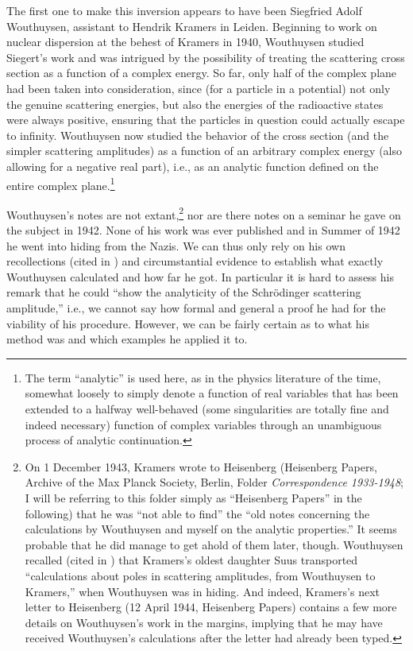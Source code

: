 \documentclass[12pt,a4paper]{article}
\begin{document}
The first one to make this inversion appears to have been Siegfried Adolf Wouthuysen, assistant to Hendrik Kramers in Leiden. Beginning to work on nuclear dispersion at the behest of Kramers in 1940, Wouthuysen studied Siegert's work and was intrigued by the possibility of treating the scattering cross section as a function of a complex energy. So far, only half of the complex plane had been taken into consideration, since (for a particle in a potential) not only the genuine scattering energies, but also the energies of the radioactive states were always positive, ensuring that the particles in question could actually escape to infinity. Wouthuysen now studied the behavior of the cross section (and the simpler scattering amplitudes) as a function of an arbitrary complex energy (also allowing for a negative real part), i.e., as an analytic function defined on the entire complex plane.\footnote{The term ``analytic'' is used here, as in the physics literature of the time, somewhat loosely to simply denote a function of real variables that has been extended to a halfway well-behaved (some singularities are totally fine and indeed necessary) function of complex variables through an unambiguous process of analytic continuation.}

Wouthuysen's notes are not extant,\footnote{On 1 December 1943, Kramers wrote to Heisenberg (Heisenberg Papers, Archive of the Max Planck Society, Berlin, Folder \emph{Correspondence 1933-1948}; I will be referring to this folder simply as ``Heisenberg Papers'' in the following) that he was ``not able to find'' the ``old notes concerning the calculations by Wouthuysen and myself on the analytic properties.'' It seems probable that he did manage to get ahold of them later, though. Wouthuysen recalled (cited in \citep[p. 454]{dresden_1987_h}) that Kramers's oldest daughter Suus transported ``calculations about poles in scattering amplitudes, from Wouthuysen to Kramers,'' when Wouthuysen was in hiding. And indeed, Kramers's next letter to Heisenberg (12 April 1944, Heisenberg Papers) contains a few more details on Wouthuysen's work in the margins, implying that he may have received Wouthuysen's calculations after the letter had already been typed.} nor are there notes on a seminar he gave on the subject in 1942. None of his work was ever published and in Summer of 1942 he went into hiding from the Nazis. We can thus only rely on his own recollections (cited in \citep[p.38-39]{cushing_1990_theory}) and circumstantial evidence to establish what exactly Wouthuysen calculated and how far he got. In particular it is hard to assess his remark that he could ``show the analyticity of the Schr\"{o}dinger scattering amplitude,'' i.e., we cannot say how formal and general a proof he had for the viability of his procedure. However, we can be fairly certain as to what his method was and which examples he applied it to.
\end{document}
